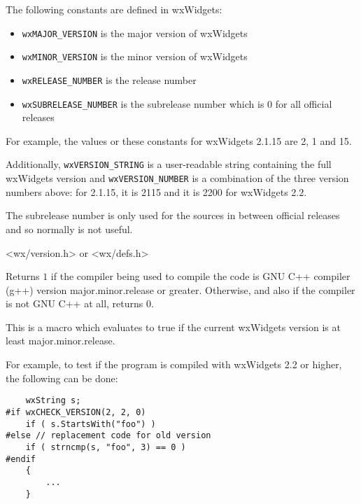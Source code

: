 The following constants are defined in wxWidgets:

\begin{itemize}\itemsep=0pt
\item {\tt wxMAJOR\_VERSION} is the major version of wxWidgets
\item {\tt wxMINOR\_VERSION} is the minor version of wxWidgets
\item {\tt wxRELEASE\_NUMBER} is the release number
\item {\tt wxSUBRELEASE\_NUMBER} is the subrelease number which is $0$ for all
official releases
\end{itemize}

For example, the values or these constants for wxWidgets 2.1.15 are 2, 1 and
15.

Additionally, {\tt wxVERSION\_STRING} is a user-readable string containing
the full wxWidgets version and {\tt wxVERSION\_NUMBER} is a combination of the
three version numbers above: for 2.1.15, it is 2115 and it is 2200 for
wxWidgets 2.2.

The subrelease number is only used for the sources in between official releases
and so normally is not useful.


<wx/version.h> or <wx/defs.h>


\label{wxcheckgccversion}


Returns $1$ if the compiler being used to compile the code is GNU C++
compiler (g++) version major.minor.release or greater. Otherwise, and also if
the compiler is not GNU C++ at all, returns $0$.


\label{wxcheckversion}


This is a macro which evaluates to true if the current wxWidgets version is at
least major.minor.release.

For example, to test if the program is compiled with wxWidgets 2.2 or higher,
the following can be done:

\begin{verbatim}
    wxString s;
#if wxCHECK_VERSION(2, 2, 0)
    if ( s.StartsWith("foo") )
#else // replacement code for old version
    if ( strncmp(s, "foo", 3) == 0 )
#endif
    {
        ...
    }
\end{verbatim}


